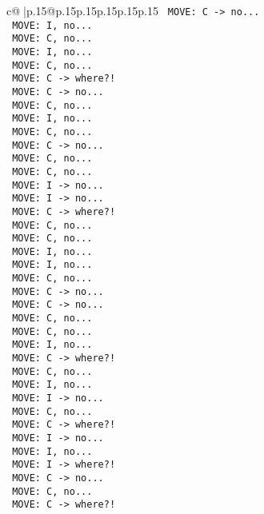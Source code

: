 \documentclass{article}
\begin{document}
{\begin{supertabular}{c@{$\;$}|p{.15\linewidth}@{}p{.15\linewidth}p{.15\linewidth}p{.15\linewidth}p{.15\linewidth}p{.15\linewidth}}
{{{\texttt{ MOVE: C {-}> no...} \\
\texttt{ MOVE: I, no...} \\
\texttt{ MOVE: C, no...} \\
\texttt{ MOVE: I, no...} \\
\texttt{ MOVE: C, no...} \\
\texttt{ MOVE: C {-}> where?!} \\
\texttt{ MOVE: C {-}> no...} \\
\texttt{ MOVE: C, no...} \\
\texttt{ MOVE: I, no...} \\
\texttt{ MOVE: C, no...} \\
\texttt{ MOVE: C {-}> no...} \\
\texttt{ MOVE: C, no...} \\
\texttt{ MOVE: C, no...} \\
\texttt{ MOVE: I {-}> no...} \\
\texttt{ MOVE: I {-}> no...} \\
\texttt{ MOVE: C {-}> where?!} \\
\texttt{ MOVE: C, no...} \\
\texttt{ MOVE: C, no...} \\
\texttt{ MOVE: I, no...} \\
\texttt{ MOVE: I, no...} \\
\texttt{ MOVE: C, no...} \\
\texttt{ MOVE: C {-}> no...} \\
\texttt{ MOVE: C {-}> no...} \\
\texttt{ MOVE: C, no...} \\
\texttt{ MOVE: C, no...} \\
\texttt{ MOVE: I, no...} \\
\texttt{ MOVE: C {-}> where?!} \\
\texttt{ MOVE: C, no...} \\
\texttt{ MOVE: I, no...} \\
\texttt{ MOVE: I {-}> no...} \\
\texttt{ MOVE: C, no...} \\
\texttt{ MOVE: C {-}> where?!} \\
\texttt{ MOVE: I {-}> no...} \\
\texttt{ MOVE: I, no...} \\
\texttt{ MOVE: I {-}> where?!} \\
\texttt{ MOVE: C {-}> no...} \\
\texttt{ MOVE: C, no...} \\
\texttt{ MOVE: C {-}> where?!} \\
}}}
\end{supertabular}}
\end{document}
